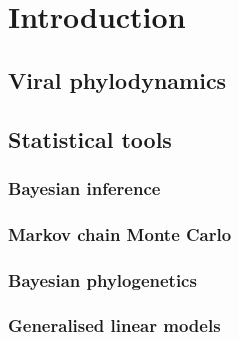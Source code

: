 \chapter{Introduction}
\section{Viral phylodynamics}
\section{Statistical tools}
\subsection{Bayesian inference}
\subsection{Markov chain Monte Carlo}
\subsection{Bayesian phylogenetics}
\subsection{Generalised linear models}
